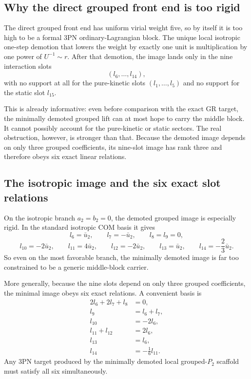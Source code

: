 \documentclass[11pt]{article}
\begin{document}
\subsection{Why the direct grouped front end is too rigid}

The direct grouped front end has uniform virial weight five, so by itself it is too high to be a formal $3$PN ordinary-Lagrangian block. The unique local isotropic one-step demotion that lowers the weight by exactly one unit is multiplication by one power of $U^{-1}\sim r$. After that demotion, the image lands only in the nine interaction slots
\begin{equation}
  (l_6,\dots,l_{14}),
\end{equation}
with no support at all for the pure-kinetic slots $(l_1,\dots,l_5)$ and no support for the static slot $l_{15}$.

This is already informative: even before comparison with the exact GR target, the minimally demoted grouped lift can at most hope to carry the middle block. It cannot possibly account for the pure-kinetic or static sectors. The real obstruction, however, is stronger than that. Because the demoted image depends on only three grouped coefficients, its nine-slot image has rank three and therefore obeys six exact linear relations.

\subsection{The isotropic image and the six exact slot relations}

On the isotropic branch $a_2=b_2=0$, the demoted grouped image is especially rigid. In the standard isotropic COM basis it gives
\begin{equation}
  l_6 = \bar u_2,
  \qquad
  l_7 = -\bar u_2,
  \qquad
  l_8 = l_9 = 0,
\end{equation}
\begin{equation}
  l_{10} = -2\bar u_2,
  \qquad
  l_{11} = 4\bar u_2,
  \qquad
  l_{12} = -2\bar u_2,
  \qquad
  l_{13} = \bar u_2,
  \qquad
  l_{14} = -\frac{2}{3}\bar u_2.
\end{equation}
So even on the most favorable branch, the minimally demoted image is far too constrained to be a generic middle-block carrier.

More generally, because the nine slots depend on only three grouped coefficients, the minimal image obeys six exact relations. A convenient basis is
\begin{align}
  2l_6 + 2l_7 + l_8 &= 0,
  \\
  l_9 &= l_6 + l_7,
  \\
  l_{10} &= -2l_6,
  \\
  l_{11} + l_{12} &= 2l_6,
  \\
  l_{13} &= l_6,
  \\
  l_{14} &= -\frac{1}{6}l_{11}.
\end{align}
Any $3$PN target produced by the minimally demoted local grouped-$P_2$ scaffold must satisfy all six simultaneously.
\end{document}

